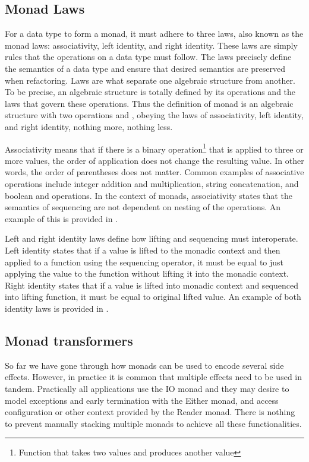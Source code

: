 \subsection{Monad Laws} \label{monads:laws}
For a data type to form a monad, it must adhere to three laws, also known as the monad laws: associativity, left identity, and right identity. These laws are simply rules that the operations on a data type must follow. The laws precisely define the semantics of a data type and ensure that desired semantics are preserved when refactoring. Laws are what separate one algebraic structure from another.
To be precise, an algebraic structure is totally defined by its operations and the laws that govern these operations. Thus the definition of monad is an algebraic structure with two operations
 and , obeying the laws of associativity, left identity, and right identity, nothing more, nothing less.~\cite{fp-in-scala}



Associativity means that if there is a binary operation\footnote{Function that takes two values and produces another value} that is applied to three or more values, the order of application does not change the resulting value. In other words, the order of parentheses does not matter. Common examples of associative operations include integer addition and multiplication, string concatenation, and boolean \inlinecode{&&} and \inlinecode{||} operations. In the context of monads, associativity states that the semantics of sequencing are not dependent on nesting of the  operations. An example of this is provided in .



Left and right identity laws define how lifting and sequencing must interoperate. Left identity states that if a value is lifted to the monadic context and then applied to a function using the sequencing operator, it must be equal to just applying the value to the function without lifting it into the monadic context. Right identity states that if a value is lifted into monadic context and sequenced into lifting function, it must be equal to original lifted value. An example of both identity laws is provided in .


\subsection{Monad transformers}\label{monads:monad-transformers}
So far we have gone through how monads can be used to encode several side effects. However, in practice it is common that multiple effects need to be used in tandem. Practically all applications use the IO monad and they may desire to model exceptions and early termination with the Either monad, and access configuration or other context provided by the Reader monad. There is nothing to prevent manually stacking multiple monads to achieve all these functionalities.

